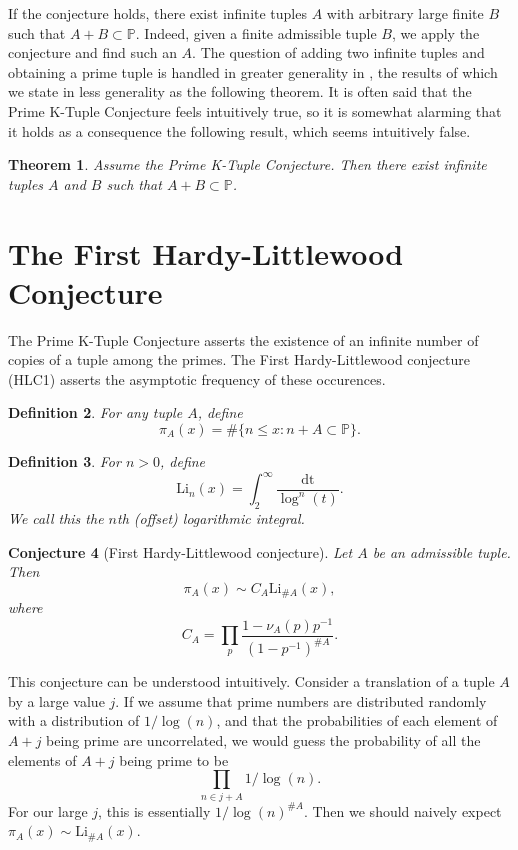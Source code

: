 \documentclass[11pt, leqno]{article}
\newtheorem{theorem}{Theorem}[section]
\newtheorem{definition}[theorem]{Definition}
\newtheorem{conjecture}[theorem]{Conjecture}
\newcommand{\Li}{\mathrm{Li}}
\begin{document}
If the conjecture holds, there exist infinite tuples $A$ with arbitrary large finite $B$ such that
$A+B\subset\mathbb{P}$. 
Indeed, given a finite admissible tuple $B$, we apply the conjecture and find such an $A$.
The question of adding two infinite tuples and obtaining a prime tuple is handled in greater generality in 
\cite{Granville},
the results of which we state in less generality as the following theorem. 
It is often said that the Prime K-Tuple Conjecture feels intuitively true, so it is somewhat alarming 
that it holds as a consequence the following result, which seems intuitively false.
\begin{theorem}
    Assume the Prime K-Tuple Conjecture.
    Then there exist infinite tuples $A$ and $B$ such that $A+B\subset\mathbb{P}$.
\end{theorem}

\section{The First Hardy-Littlewood Conjecture}

The Prime K-Tuple Conjecture asserts the existence of an infinite
number of copies of a tuple among the primes.
The First Hardy-Littlewood conjecture (HLC1) asserts the asymptotic frequency
of these occurences.

\begin{definition}
    For any tuple $A$, define 
    $$\pi_A(x) = \#\{n \le x : n + A \subset \mathbb{P} \}.$$
\end{definition}

\begin{definition}
    For $n>0$, define 
    $$\Li_n(x) = \int_{2}^{\infty}\frac{\mathrm{dt}}{\log^n(t)}.$$
    We call this the $n$th (offset) logarithmic integral.
\end{definition}
\begin{conjecture}[First Hardy-Littlewood conjecture]\label{HLC}
Let $A$ be an admissible tuple. Then
$$\pi_A(x) \sim C_A\Li_{\#A}(x),$$
where
$$C_A = \prod_{p}\frac{1-\nu_A(p)p^{-1}}{(1-p^{-1})^{\#A}}.$$
\end{conjecture}

This conjecture can be understood intuitively.
Consider a translation of a tuple $A$ by a large value $j$.
If we assume that prime numbers are distributed randomly with 
a distribution of $1/\log(n)$, and that the probabilities of each element
of $A+j$ being prime are uncorrelated, we would guess the probability of all the 
elements of $A+j$ being prime to be
$$\prod_{n\in j+A}1/\log(n).$$
For our large $j$, this is essentially $1/\log(n)^{\#A}$.
Then we should naively expect $\pi_A(x) \sim \Li_{\#A}(x)$.
\end{document}
